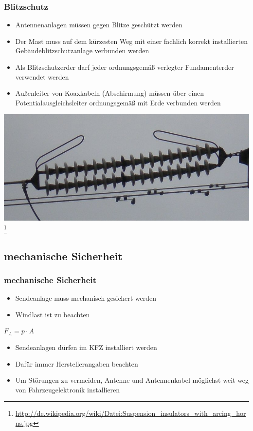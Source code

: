 \begin{frame}
	\frametitle{Blitzschutz}
	\begin{itemize}
		\item	Antennenanlagen müssen gegen Blitze geschützt werden
		\item	Der Mast muss auf dem kürzesten Weg mit einer fachlich korrekt installierten 					Gebäudeblitzschutzanlage verbunden werden
		\item	Als Blitzschutzerder darf jeder ordnungsgemäß verlegter Fundamenterder 							verwendet werden
		\item	Außenleiter von Koaxkabeln (Abschirmung) müssen über einen 										Potentialausgleichsleiter ordnungsgemäß mit Erde verbunden werden 
 	\end{itemize}
 	\begin{center}
 		\includegraphics[scale=0.2]{e18/Funkenstrecke}
 		\footnote{\url{http://de.wikipedia.org/wiki/Datei:Suspension_insulators_with_arcing_horns.jpg}}
 	\end{center}
 
\end{frame}

\subsection{mechanische Sicherheit}

\begin{frame}
	\frametitle{mechanische Sicherheit}
	\begin{itemize}
		\item	Sendeanlage muss mechanisch gesichert werden
		\item	Windlast ist zu beachten
	\end{itemize}
	\begin{center}
		\Large{$F_{A} = p \cdot A$}
	\end{center}	
	\begin{normalsize}
	
	\end{normalsize}
	\begin{itemize}
		\item	Sendeanlagen dürfen im KFZ installiert werden
		\item	Dafür immer Herstellerangaben beachten
		\item	Um Störungen zu vermeiden, Antenne und Antennenkabel möglichst weit weg von 					Fahrzeugelektronik installieren
	\end{itemize}
\end{frame}

